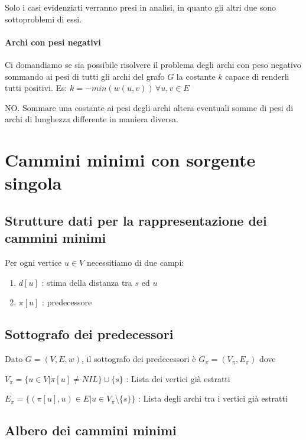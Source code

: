 {Solo i casi evidenziati verranno presi in analisi, in quanto gli altri due sono sottoproblemi di essi.}

\paragraph{Archi con pesi negativi}

{Ci domandiamo se sia possibile risolvere il problema degli archi con peso negativo sommando ai pesi di tutti gli archi del grafo $G$ la costante $k$ capace di renderli tutti positivi. Es: $k=-min(w(u,v))\,\forall u,v \in E$}

{NO. Sommare una costante ai pesi degli archi altera eventuali somme di pesi di archi di lunghezza differente in maniera diversa.}

\section{Cammini minimi con sorgente singola}

\subsection{Strutture dati per la rappresentazione dei cammini minimi}

{Per ogni vertice $u \in V$ necessitiamo di due campi:}

\begin{enumerate}
\tightlist
\item
$d[u]$ : stima della distanza tra $s$ ed $u$
\item
$\pi[u]$ : predecessore
\end{enumerate}

\subsection{Sottografo dei predecessori}

{Dato $G=(V,E,w)$, il sottografo dei predecessori è $G_\pi=(V_\pi,E_\pi)$ dove}

$V_\pi=\{u \in V | \pi[u] \neq NIL\} \cup \{s\}$ : Lista dei vertici già estratti

$E_\pi=\{(\pi[u],u) \in E | u \in V_{\pi} \setminus \{s\}\}$ : Lista degli archi tra i vertici già estratti

\subsection{Albero dei cammini minimi}

